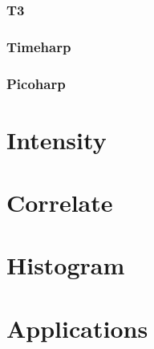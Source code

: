 \documentclass{article}
\begin{document}
\subsubsection{T3}
\subsubsection{Timeharp}
\subsubsection{Picoharp}

\section{Intensity}
\section{Correlate}
\section{Histogram}

\section{Applications}
\end{document}
